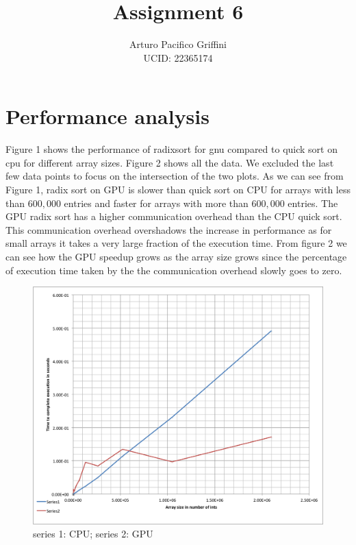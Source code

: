 \documentclass[11pt,letter]{article}
\title{Assignment 6 }
\author{Arturo Pacifico Griffini\\
  UCID: 22365174}
\date{}
\begin{document}
%

\pagebreak



\section{Performance analysis}

Figure 1 shows the performance of radixsort for gnu compared to quick sort on cpu for different array sizes. Figure 2 shows all the data. We excluded the last few data points to focus on the intersection of the two plots. As we can see from Figure 1, radix sort on GPU is slower than quick sort on CPU for arrays with less than $600,000$ entries and faster for arrays with more than $600,000$ entries. The GPU radix sort has a higher communication overhead than the CPU quick sort. This communication overhead overshadows the increase in performance as for small arrays it takes a very large fraction of the execution time. From figure 2 we can see how the GPU speedup grows as the array size grows since the percentage of execution time taken by the the communication overhead slowly goes to zero. 
\begin{figure}[h]
\centering
\includegraphics[width=1\textwidth]{short-graph.png}
\caption{series 1: CPU; series 2: GPU}
\label{fig:awesome_image}
\end{figure}
\end{document}
